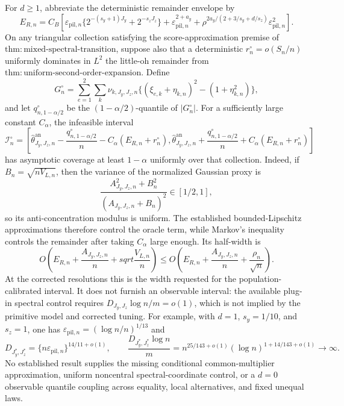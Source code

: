 For \(d\ge1\), abbreviate the deterministic remainder envelope by
\[
E_{R,n}=C_B\left[
\varepsilon_{\mathrm{pil},n}\{2^{-(s_y+1)J_y}+2^{-s_zJ_z}\}
+\varepsilon_{\mathrm{pil},n}^{2+a_y}
+\rho^{2a_y/(2+3/s_y+d/s_z)}\varepsilon_{\mathrm{pil},n}^2
\right].
\]
On any triangular collection satisfying the score-approximation premise of \(\mathrm{thm{:}mixed\text{-}spectral\text{-}transition}\), suppose also that a deterministic \(r_n^\circ=o(S_n/n)\) uniformly dominates in \(L^2\) the little-oh remainder from \(\mathrm{thm{:}uniform\text{-}second\text{-}order\text{-}expansion}\). Define
\[
G_n^\circ=\sum_{e=1}^2\sum_k\nu_{k,J_y,J_z,n}
\{(\xi_{e,k}+\eta_{k,n})^2-(1+\eta_{k,n}^2)\},
\]
and let \(q_{n,1-\alpha/2}^\circ\) be the \((1-\alpha/2)\)-quantile of \(|G_n^\circ|\). For a sufficiently large constant \(C_\alpha\), the infeasible interval
\[
\mathcal I_n^\circ=
\left[
\widehat\theta^{\mathrm{an}}_{J_y,J_z,n}
-\frac{q_{n,1-\alpha/2}^\circ}{n}-C_\alpha(E_{R,n}+r_n^\circ),
\widehat\theta^{\mathrm{an}}_{J_y,J_z,n}
+\frac{q_{n,1-\alpha/2}^\circ}{n}+C_\alpha(E_{R,n}+r_n^\circ)
\right]
\]
has asymptotic coverage at least \(1-\alpha\) uniformly over that collection. Indeed, if \(B_n=\sqrt{nV_{L,n}}\), then the variance of the normalized Gaussian proxy is
\[
\frac{A_{J_y,J_z,n}^2+B_n^2}{(A_{J_y,J_z,n}+B_n)^2}\in[1/2,1],
\]
so its anti-concentration modulus is uniform. The established bounded-Lipschitz approximations therefore control the oracle term, while Markov's inequality controls the remainder after taking \(C_\alpha\) large enough. Its half-width is
\[
O\!\left(E_{R,n}+\frac{A_{J_y,J_z,n}}n+sqrt{\frac{V_{L,n}}n}\right)
\le
O\!\left(E_{R,n}+\frac{A_{J_y,J_z,n}}n+\frac{\rho_n}{\sqrt n}\right).
\]
At the corrected resolutions this is the width requested for the population-calibrated interval. It does not furnish an observable interval: the available plug-in spectral control requires \(D_{J_y,J_z}\log n/m=o(1)\), which is not implied by the primitive model and corrected tuning. For example, with \(d=1\), \(s_y=1/10\), and \(s_z=1\), one has \(\varepsilon_{\mathrm{pil},n}=(\log n/n)^{1/13}\) and
\[
D_{J_y^*,J_z^*}=\{n\varepsilon_{\mathrm{pil},n}\}^{14/11+o(1)},
\qquad
\frac{D_{J_y^*,J_z^*}\log n}{m}
=n^{25/143+o(1)}(\log n)^{1+14/143+o(1)}\longrightarrow\infty.
\]
No established result supplies the missing conditional common-multiplier approximation, uniform noncentral spectral-coordinate control, or a \(d=0\) observable quantile coupling across equality, local alternatives, and fixed unequal laws.
